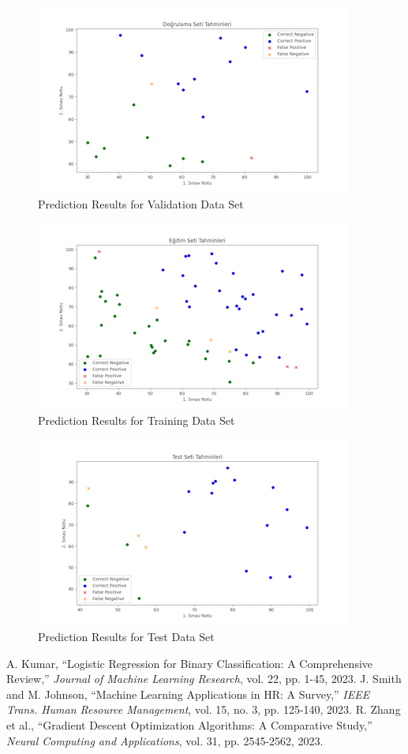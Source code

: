 \documentclass[conference]{IEEEtran}
\begin{document}
\begin{figure}
\centering
\includegraphics{images/validation_predictions.png}
\caption{Prediction Results for Validation Data Set}
\label{fig:validation_predictions}
\end{figure}

\begin{figure}
\centering
\includegraphics{images/training_predictions.png}
\caption{Prediction Results for Training Data Set}
\label{fig:training_predictions}
\end{figure}


\begin{figure}
\centering
\includegraphics{images/test_predictions.png}
\caption{Prediction Results for Test Data Set}
\label{fig:test_predictions}
\end{figure}


\begin{thebibliography}{00}
 A. Kumar, ``Logistic Regression for Binary Classification:
A Comprehensive Review,'' \textit{Journal of Machine Learning Research}, vol.
22, pp. 1-45, 2023.
 J. Smith and M. Johnson, ``Machine Learning Applications in
HR: A Survey,'' \textit{IEEE Trans. Human Resource Management}, vol. 15, no. 3,
pp. 125-140, 2023.
 R. Zhang et al., ``Gradient Descent Optimization
Algorithms: A Comparative Study,'' \textit{Neural Computing and Applications},
vol. 31, pp. 2545-2562, 2023.
\end{thebibliography}
\end{document}
